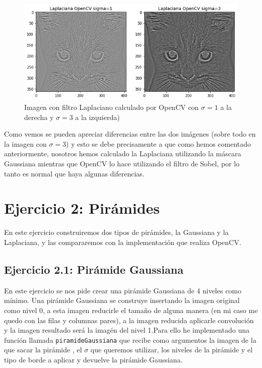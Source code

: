 \documentclass[12pt,spanish]{article}
\begin{document}
\begin{figure}[H]
	\centering
	\includegraphics[width=\textwidth]{./imagenes_memoria/com_sigma_laplaciana_opencv.png}
	\caption{Imagen con filtro Laplaciano calculado por OpenCV con $\sigma=1$ a la derecha y $\sigma=3$ a la izquierda)}
	\label{comp_sigma_laplaciana_opencv}
\end{figure}

Como vemos se pueden apreciar diferencias entre las dos imágenes (sobre todo en la imagen con $\sigma=3$) y esto se debe precisamente a que como hemos comentado anteriormente, nosotros hemos calculado la Laplaciana utilizando la máscara Gaussiana mientras que OpenCV lo hace utilizando el filtro de Sobel, por lo tanto es normal que haya algunas diferencias.

\section{Ejercicio 2: Pirámides}
En este ejercicio construiremos dos tipos de pirámides, la Gaussiana y la Laplaciana, y las compararemos con la implementación que realiza OpenCV.

\subsection{Ejercicio 2.1: Pirámide Gaussiana}
En este ejercicio se nos pide crear una pirámide Gaussiana de 4 niveles como mínimo. Una pirámide Gaussiana se construye insertando la imagen original como nivel 0, a esta imagen reducirle el tamaño de alguna manera (en mi caso me quedo con las filas y columnas pares), a la imagen reducida aplicarle convolución y la imagen resultado será la imagén del nivel 1.Para  ello he implementado una función llamada \texttt{piramideGaussiana} que recibe como argumentos la imagen de la que sacar la pirámide , el $\sigma$ que queremos utilizar, los niveles de la pirámide y el tipo de borde a aplicar y devuelve la pirámide Gaussiana.\\
\end{document}
